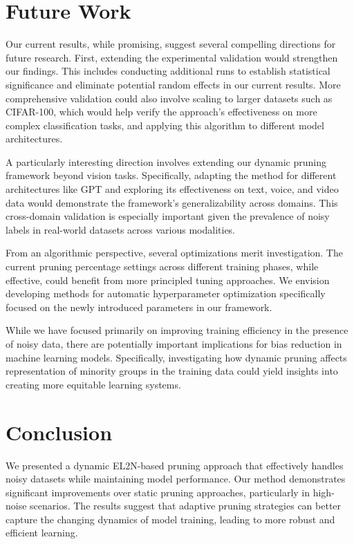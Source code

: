 \documentclass{article}
\begin{document}
\section{Future Work}

Our current results, while promising, suggest several compelling directions for future research. First, extending the experimental validation would strengthen our findings. This includes conducting additional runs to establish statistical significance and eliminate potential random effects in our current results. More comprehensive validation could also involve scaling to larger datasets such as CIFAR-100, which would help verify the approach's effectiveness on more complex classification tasks, and applying this algorithm to different model architectures. 

A particularly interesting direction involves extending our dynamic pruning framework beyond vision tasks. Specifically, adapting the method for different architectures like GPT and exploring its effectiveness on text, voice, and video data would demonstrate the framework's generalizability across domains. This cross-domain validation is especially important given the prevalence of noisy labels in real-world datasets across various modalities.

From an algorithmic perspective, several optimizations merit investigation. The current pruning percentage settings across different training phases, while effective, could benefit from more principled tuning approaches. We envision developing methods for automatic hyperparameter optimization specifically focused on the newly introduced parameters in our framework.

While we have focused primarily on improving training efficiency in the presence of noisy data, there are potentially important implications for bias reduction in machine learning models. Specifically, investigating how dynamic pruning affects representation of minority groups in the training data could yield insights into creating more equitable learning systems.

\section{Conclusion}
We presented a dynamic EL2N-based pruning approach that effectively handles noisy datasets while maintaining model performance. Our method demonstrates significant improvements over static pruning approaches, particularly in high-noise scenarios. The results suggest that adaptive pruning strategies can better capture the changing dynamics of model training, leading to more robust and efficient learning.
\end{document}
